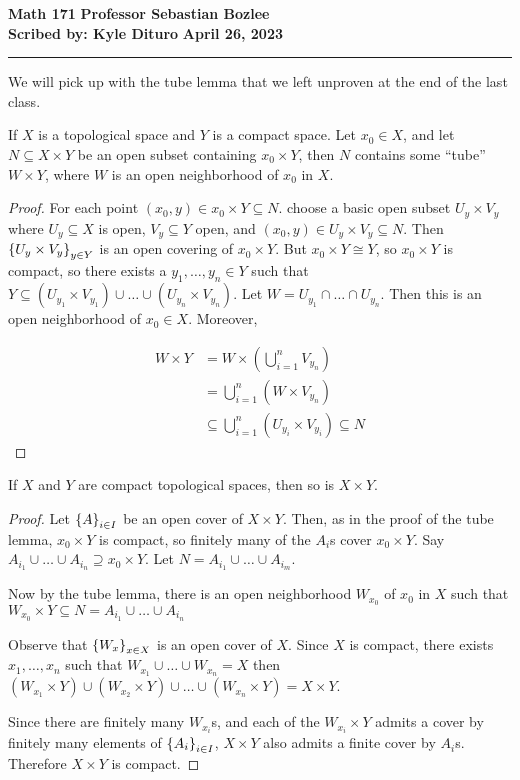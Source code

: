 \documentclass[12pt, twosided]{article}
\begin{document}
\noindent \textbf{Math 171} \hfill \textbf{Professor Sebastian Bozlee} \\
\textbf{Scribed by: Kyle Dituro} \hfill \textbf{April 26, 2023}\hrule
\vspace{.2in}
We will pick up with the tube lemma that we left unproven at the end of the last class.
\begin{lm}
  If \(X\) is a topological space and \(Y\) is a compact space. Let \(x_0 \in X\), and let \(N \subseteq X \times Y\) be an open subset containing \(x_0 \times Y\), then \(N\) contains some ``tube'' \(W \times Y\), where \(W\) is an open neighborhood of \(x_0\) in \(X\).
\end{lm}
\begin{proof}
  For each point \((x_0, y) \in x_0 \times Y \subseteq N\). choose a basic open subset \(U_y \times V_y\) where \(U_y \subseteq X\) is open, \(V_y \subseteq Y\) open, and \((x_0, y) \in U_y \times V_y \subseteq N\). Then \(\left\{ U_y \times V_y \right\}_{y \in Y}\) is an open covering of \(x_0 \times Y\). But \(x_0 \times Y \cong Y\), so \(x_0 \times Y\) is compact, so there exists a \(y_1, \ldots, y_n \in Y\) such that \(Y \subseteq (U_{y_1} \times V_{y_1})\cup \ldots \cup (U_{y_n} \times V_{y_n})\). Let \(W = U_{y_1} \cap \ldots \cap U_{y_n}\). Then this is an open neighborhood of \(x_0 \in X\). Moreover,

  \begin{align*}
    W \times Y &= W \times \left(\bigcup_{i=1}^nV_{y_n}\right) \\
               &=\bigcup_{i = 1}^n (W \times V_{y_n}) \\
               &\subseteq \bigcup_{i = 1}^n ( U_{y_i} \times V_{y_i}) \subseteq N
  \end{align*}
\end{proof}

\begin{thm}
  If \(X\) and \(Y\) are compact topological spaces, then so is \(X \times Y\).
\end{thm}

\begin{proof}
  Let \(\left\{ A \right\}_{i \in I}\) be an open cover of \(X \times Y\). Then, as in the proof of the tube lemma, \(x_0 \times Y\) is compact, so finitely many of the \(A_i\)s cover \(x_0 \times Y\). Say \(A_{i_1} \cup \ldots \cup A_{i_n} \supseteq x_0 \times Y\). Let \(N = A_{i_1} \cup \ldots \cup A_{i_m}\).

  Now by the tube lemma, there is an open neighborhood \(W_{x_0}\) of \(x_0\) in \(X\) such that \(W_{x_0} \times Y\subseteq N = A_{i_1} \cup \ldots\cup A_{i_n}\)

  Observe that  \(\left\{ W_x \right\}_{x \in X}\) is an open cover of \(X\). Since \(X\) is compact, there exists \(x_1, \ldots, x_n\) such that \(W_{x_1} \cup \ldots \cup W_{x_n} = X\) then \((W_{x_1} \times Y) \cup (W_{x_2} \times Y) \cup \ldots \cup (W_{x_n} \times Y) = X \times Y\).

  Since there are finitely many \(W_{x_i}\)s, and each of the \(W_{x_i} \times Y\) admits a cover by finitely many elements of \(\left\{ A_i \right\}_{i \in I}\), \(X \times Y\) also admits a finite cover by \(A_i\)s. Therefore \(X \times Y\) is compact.
\end{proof}
\end{document}
